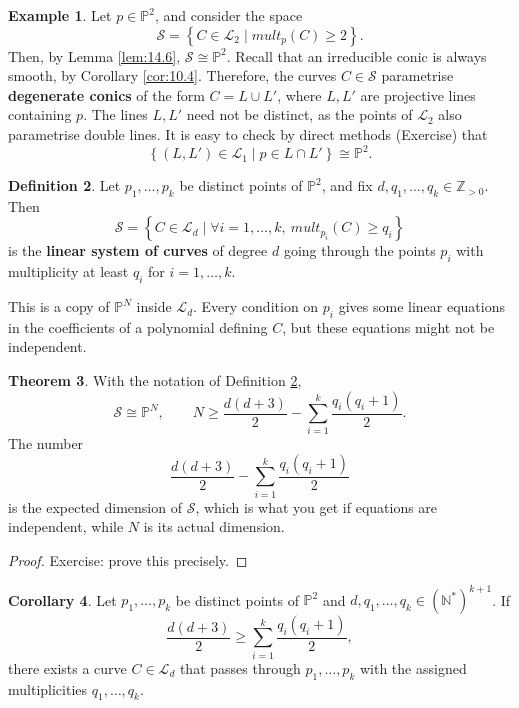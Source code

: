 \documentclass{article}
\newcommand{\N}{\mathbb{N}}
\newcommand{\Z}{\mathbb{Z}}
\renewcommand{\P}{\mathbb{P}}
\renewcommand{\L}{\mathcal{L}}
\renewcommand{\S}{\mathcal{S}}
\newcommand{\rb}[1]{\left( #1 \right)}
\newcommand{\cb}[1]{\left\{ #1 \right\}}
\theoremstyle{definition}\newtheorem{definition}{Definition}[section]
\theoremstyle{definition}\newtheorem{notation}[definition]{Notation}
\theoremstyle{definition}\newtheorem{remark}[definition]{Remark}
\theoremstyle{definition}\newtheorem{example1}[definition]{Example}
\theoremstyle{definition}\newtheorem{fact}{Fact}
\theoremstyle{definition}\newtheorem{exercise}{Exercise}
\theoremstyle{definition}\newtheorem*{example2}{Example}
\newtheorem{theorem}[definition]{Theorem}
\newtheorem{corollary}[definition]{Corollary}
\begin{document}
\begin{example1}
Let $ p \in \P^2 $, and consider the space
$$ \S = \cb{C \in \L_2 \mid mult_p\rb{C} \ge 2}. $$
Then, by Lemma \ref{lem:14.6}, $ \S \cong \P^2 $. Recall that an irreducible conic is always smooth, by Corollary \ref{cor:10.4}. Therefore, the curves $ C \in \S $ parametrise \textbf{degenerate conics} of the form $ C = L \cup L' $, where $ L, L' $ are projective lines containing $ p $. The lines $ L, L' $ need not be distinct, as the points of $ \L_2 $ also parametrise double lines. It is easy to check by direct methods (Exercise) that
$$ \cb{\rb{L, L'} \in \L_1 \mid p \in L \cap L'} \cong \P^2. $$
\end{example1}


\begin{definition}
\label{def:14.8}
Let $ p_1, \dots, p_k $ be distinct points of $ \P^2 $, and fix $ d, q_1, \dots, q_k \in \Z_{> 0} $. Then
$$ \S = \cb{C \in \L_d \mid \forall i = 1, \dots, k, \ mult_{p_i}\rb{C} \ge q_i} $$
is the \textbf{linear system of curves} of degree $ d $ going through the points $ p_i $ with multiplicity at least $ q_i $ for $ i = 1, \dots, k $.
\end{definition}

This is a copy of $ \P^N $ inside $ \L_d $. Every condition on $ p_i $ gives some linear equations in the coefficients of a polynomial defining $ C $, but these equations might not be independent.

\begin{theorem}
\label{thm:14.9}
With the notation of Definition \ref{def:14.8},
$$ \S \cong \P^N, \qquad N \ge \dfrac{d\rb{d + 3}}{2} - \sum_{i = 1}^k \dfrac{q_i\rb{q_i + 1}}{2}. $$
The number
$$ \dfrac{d\rb{d + 3}}{2} - \sum_{i = 1}^k \dfrac{q_i\rb{q_i + 1}}{2} $$
is the expected dimension of $ \S $, which is what you get if equations are independent, while $ N $ is its actual dimension.
\end{theorem}

\begin{proof}
Exercise: prove this precisely.
\end{proof}

\begin{corollary}
Let $ p_1, \dots, p_k $ be distinct points of $ \P^2 $ and $ d, q_1, \dots, q_k \in \rb{\N^*}^{k + 1} $. If
$$ \dfrac{d\rb{d + 3}}{2} \ge \sum_{i = 1}^k \dfrac{q_i\rb{q_i + 1}}{2}, $$
there exists a curve $ C \in \L_d $ that passes through $ p_1, \dots, p_k $ with the assigned multiplicities $ q_1, \dots, q_k $.
\end{corollary}
\end{document}
